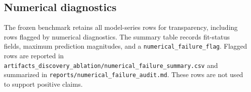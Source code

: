 \subsection{Numerical diagnostics}

The frozen benchmark retains all model-series rows for transparency, including
rows flagged by numerical diagnostics. The summary table records fit-status
fields, maximum prediction magnitudes, and a
\texttt{numerical\_failure\_flag}. Flagged rows are reported in
\texttt{artifacts\_discovery\_ablation/numerical\_failure\_summary.csv} and
summarized in \texttt{reports/numerical\_failure\_audit.md}. These rows are not
used to support positive claims.
